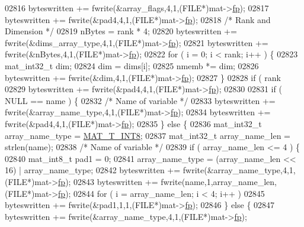 \begin{DoxyCode}
{{{{{{{{{{{{{{{{02816     byteswritten += fwrite(&array\_flags,4,1,(FILE*)mat->\hyperlink{struct__mat__t_a85f562e407ca9ad4d2a6e14f839432b7}{fp});
02817     byteswritten += fwrite(&pad4,4,1,(FILE*)mat->\hyperlink{struct__mat__t_a85f562e407ca9ad4d2a6e14f839432b7}{fp});
02818     \textcolor{comment}{/* Rank and Dimension */}
02819     nBytes = rank * 4;
02820     byteswritten += fwrite(&dims\_array\_type,4,1,(FILE*)mat->\hyperlink{struct__mat__t_a85f562e407ca9ad4d2a6e14f839432b7}{fp});
02821     byteswritten += fwrite(&nBytes,4,1,(FILE*)mat->\hyperlink{struct__mat__t_a85f562e407ca9ad4d2a6e14f839432b7}{fp});
02822     \textcolor{keywordflow}{for} ( i = 0; i < rank; i++ ) \{
02823         mat\_int32\_t dim;
02824         dim = dims[i];
02825         nmemb *= dim;
02826         byteswritten += fwrite(&dim,4,1,(FILE*)mat->\hyperlink{struct__mat__t_a85f562e407ca9ad4d2a6e14f839432b7}{fp});
02827     \}
02828     \textcolor{keywordflow}{if} ( rank %
02829         byteswritten += fwrite(&pad4,4,1,(FILE*)mat->\hyperlink{struct__mat__t_a85f562e407ca9ad4d2a6e14f839432b7}{fp});
02830 
02831     \textcolor{keywordflow}{if} ( NULL == name ) \{
02832         \textcolor{comment}{/* Name of variable */}
02833         byteswritten += fwrite(&array\_name\_type,4,1,(FILE*)mat->\hyperlink{struct__mat__t_a85f562e407ca9ad4d2a6e14f839432b7}{fp});
02834         byteswritten += fwrite(&pad4,4,1,(FILE*)mat->\hyperlink{struct__mat__t_a85f562e407ca9ad4d2a6e14f839432b7}{fp});
02835     \} \textcolor{keywordflow}{else} \{
02836         mat\_int32\_t  array\_name\_type = \hyperlink{group___m_a_t_ggacf7b3b879282b7ab3a51190e49bf3453a9807f5033ed4f9b548953742d9fd1658}{MAT\_T\_INT8};
02837         mat\_int32\_t  array\_name\_len   = strlen(name);
02838         \textcolor{comment}{/* Name of variable */}
02839         \textcolor{keywordflow}{if} ( array\_name\_len <= 4 ) \{
02840             mat\_int8\_t  pad1 = 0;
02841             array\_name\_type = (array\_name\_len << 16) | array\_name\_type;
02842             byteswritten += fwrite(&array\_name\_type,4,1,(FILE*)mat->\hyperlink{struct__mat__t_a85f562e407ca9ad4d2a6e14f839432b7}{fp});
02843             byteswritten += fwrite(name,1,array\_name\_len,(FILE*)mat->\hyperlink{struct__mat__t_a85f562e407ca9ad4d2a6e14f839432b7}{fp});
02844             \textcolor{keywordflow}{for} ( i = array\_name\_len; i < 4; i++ )
02845                 byteswritten += fwrite(&pad1,1,1,(FILE*)mat->\hyperlink{struct__mat__t_a85f562e407ca9ad4d2a6e14f839432b7}{fp});
02846         \} \textcolor{keywordflow}{else} \{
02847             byteswritten += fwrite(&array\_name\_type,4,1,(FILE*)mat->\hyperlink{struct__mat__t_a85f562e407ca9ad4d2a6e14f839432b7}{fp});
}}}}}}}}}}}}}}}}
\end{DoxyCode}
